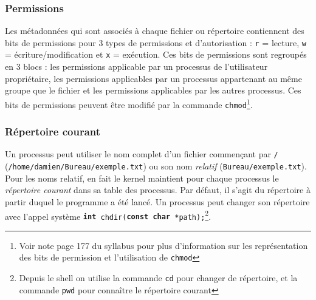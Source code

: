 \subsubsection{Permissions}
\label{sysfichierutilisateur}
Les métadonnées qui sont associés à chaque fichier ou répertoire contiennent des bits de permissions pour 3 types de permissions et d'autorisation : \texttt{r} = lecture, \texttt{w} = écriture/modification et \texttt{x} = exécution.
Ces bits de permissions sont regroupés en 3 blocs : les permissions applicable par un processus de l'utilisateur propriétaire, les permissions applicables par un processus appartenant au même groupe que le fichier et les permissions applicables par les autres processus. Ces bits de permissions peuvent être modifié par la commande \texttt{chmod}\footnote{Voir note page 177 du syllabus pour plus d'information sur les représentation des bits de permission et l'utilisation de \texttt{chmod}}. \\

\subsubsection{Répertoire courant}
Un processus peut utiliser le nom complet d'un fichier commençant par \texttt{/} (\texttt{/home/damien/Bureau/exemple.txt}) ou son nom \textit{relatif} (\texttt{Bureau/exemple.txt}). Pour les noms relatif, en fait le kernel maintient pour chaque processus le \textit{répertoire courant} dans sa table des processus. Par défaut, il s'agit du répertoire à partir duquel le programme a été lancé. Un processus peut changer son répertoire avec l'appel système \texttt{\textbf{int} chdir(\textbf{const} \textbf{char} *path);}\footnote{Depuis le shell on utilise la commande \texttt{cd} pour changer de répertoire, et la commande \texttt{pwd} pour connaître le répertoire courant}.

